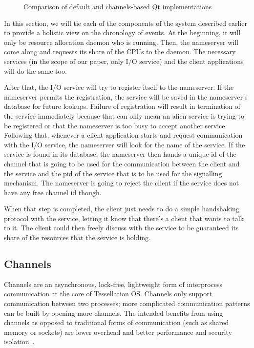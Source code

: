 \documentclass[letterpaper,twocolumn,11pt]{article}
\begin{document}
\begin{figure}[t]
\begin{center}
  \end{center}
  \caption{Comparison of default and channels-based Qt implementations}
  \label{fig:implementation}
\end{figure}

In this section, we will tie each of the components of the system described earlier to provide a holistic view on the chronology of events. At the beginning, it will only be resource allocation daemon who is running. Then, the nameserver will come along and requests its share of the CPUs to the daemon. The necessary services (in the scope of our paper, only I/O service) and the client applications will do the same too. 

After that, the I/O service will try to register itself to the nameserver. If the nameserver permits the registration, the service will be saved in the nameserver's database for future lookups. Failure of registration will result in termination of the service immediately because that can only mean an alien service is trying to be registered or that the nameserver is too busy to accept another service. Following that, whenever a client application starts and request communication with the I/O service, the nameserver will look for the name of the service. If the service is found in its database, the nameserver then hands a unique id of the channel that is going to be used for the communication between the client and the service and the pid of the service that is to be used for the signalling mechanism. The nameserver is going to reject the client if the service does not have any free channel id though.

When that step is completed, the client just needs to do a simple handshaking protocol with the service, letting it know that there's a client that wants to talk to it. The client could then freely discuss with the service to be guaranteed its share of the resources that the service is holding.

\subsection{Channels}

Channels are an asynchronous, lock-free, lightweight form of interprocess communication at the core of Tessellation OS. Channels only support communication between two processes; more complicated communication patterns can be built by opening more channels. The intended benefits from using channels as opposed to traditional forms of communication (such as shared memory or sockets) are lower overhead and better performance and security isolation~\cite{tessellation-hotpar10}.
\end{document}
